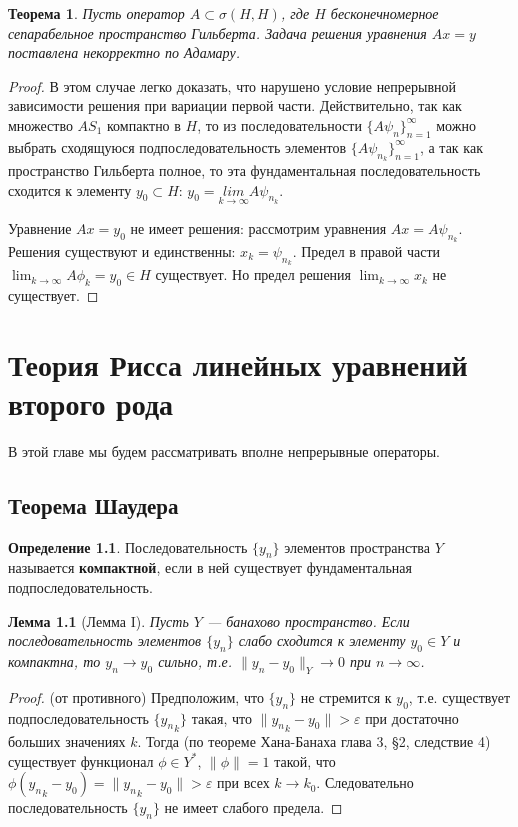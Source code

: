 \documentclass[12pt,a4paper,titlepage,oneside]{book}
\theoremstyle{definition}
\newtheorem*{definition}{Определение}
\theoremstyle{plain}
\newtheorem*{theorem}{Теорема}
\theoremstyle{remark}
\theoremstyle{remark}
\theoremstyle{remark}
\theoremstyle{remark}
\theoremstyle{plain}
\newtheorem*{lemma}{Лемма}
\theoremstyle{plain}
\begin{document}
\begin{theorem}
Пусть оператор $A \subset \sigma (H,H)$, где $H$ бесконечномерное сепарабельное пространство Гильберта. Задача решения уравнения $Ax=y$ поставлена некорректно по Адамару.
\end{theorem}

\begin{proof}
В этом случае легко доказать, что нарушено условие непрерывной зависимости решения при вариации первой части. Действительно, так как множество $AS_1$ компактно в $H$, то из последовательности $\lbrace A \psi_n\rbrace_{n=1}^{\infty}$ можно выбрать сходящуюся подпоследовательность элементов $\lbrace A \psi_{n_k}\rbrace_{n=1}^{\infty}$, а так как пространство Гильберта полное, то эта фундаментальная последовательность сходится к элементу $y_0 \subset H$: $y_0=\underset{k \to \infty}{lim} A \psi_{n_k}$.

Уравнение $Ax = y_0$ не имеет решения: рассмотрим уравнения $Ax = A \psi_{n_k}$. Решения существуют и единственны: $x_k = \psi_{n_k}$. Предел в правой части $\displaystyle\lim_{k \to \infty} A \phi_k = y_0 \in H$ существует. Но предел решения $\displaystyle\lim_{k \to \infty} x_k$ не существует.
\end{proof}

\chapter{Теория Рисса линейных уравнений второго рода}

В этой главе мы будем рассматривать вполне непрерывные операторы.

\section{Теорема Шаудера}

\begin{definition}
Последовательность $\{y_n\}$ элементов пространства $Y$ называется \textbf{компактной}, если в ней существует фундаментальная подпоследовательность.
\end{definition}

\begin{lemma}[Лемма I]
Пусть $Y$ --- банахово пространство. Если последовательность элементов $\{y_n\}$ слабо сходится к элементу $y_0 \in Y$ и компактна, то $y_n\to y_0$ сильно, т.е. $\lVert y_n - y_0\rVert_Y\to 0$ при $n\to\infty$.
\end{lemma}

\begin{proof}
(от противного) Предположим, что $\{y_n\}$ не стремится к $y_0$, т.е. существует подпоследовательность $\{{y_n}_k\}$ такая, что $\lVert {y_n}_k-y_0\rVert > \varepsilon$ при достаточно больших значениях $k$. Тогда (по теореме Хана-Банаха глава 3, \S 2, следствие 4) существует функционал $\phi\in Y^*$, $\lVert\phi\rVert=1$ такой, что $\phi({y_n}_k-y_0)=\lVert {y_n}_k-y_0\rVert > \varepsilon$ при всех $k\to k_0$. Следовательно последовательность $\{y_n\}$ не имеет слабого предела.
\end{proof}
\end{document}
